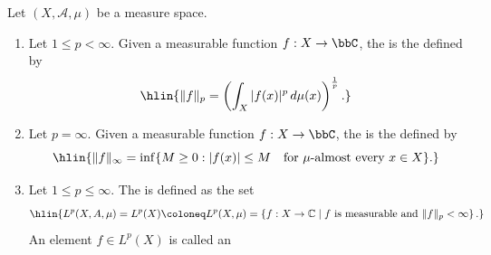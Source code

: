 \begin{definition} \label{definition:L_p_norm_on_a_measure_space}
Let \( (X, \mathcal{A}, \mu) \) be a measure space. 
    \begin{enumerate}
        \item Let \( 1 \leq p < \infty \). Given a measurable function $f: X \to \bbC$, the  is the  defined by
        $$\hlin{\|f\|_{p} = \left( \int_{X} |f(x)|^{p} \, d\mu(x) \right)^{\frac{1}{p}}.}$$
        

        \item Let \( p = \infty \). Given a measurable function $f: X \to \bbC$, the  is the  defined by
        $$\hlin{\|f\|_{\infty} = \inf \{ M \geq 0 : |f(x)| \leq M \quad \text{for } \mu\text{-almost every } x \in X \}.}$$

        \item Let $1 \leq p \leq \infty$. The  is defined as the set
        $$\hlin{L^{p}(X,A,\mu) = L^{p}(X) \coloneq L^{p}(X, \mu) =\left\{ f : X \to \mathbb{C} \mid f \text{ is measurable and } \|f\|_p < \infty \right\}.}$$
        An element $f \in L^p(X)$ is called an 


    \end{enumerate}
\end{definition}